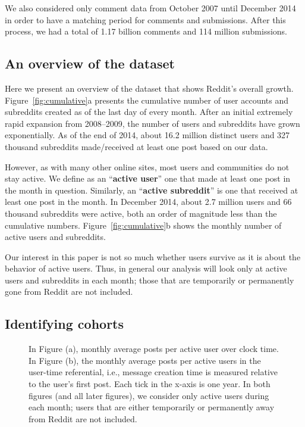We also considered only comment data from October 2007 until December 2014 in order to have a matching period for comments and submissions. After this process, we had a total of 1.17 billion comments and 114 million submissions.

\subsection{An overview of the dataset}

Here we present an overview of the dataset that shows Reddit's overall growth.  Figure~\ref{fig:cumulative}a presents the cumulative number of user accounts and subreddits created as of the last day of every month. After an initial extremely rapid expansion from 2008--2009, the number of users and subreddits have grown exponentially.  As of the end of 2014, about 16.2 million distinct users and 327 thousand subreddits made/received at least one post based on our data.

However, as with many other online sites, most users \cite{Scellato2011,Hughes2009,Java2007} and communities \cite{Arguello2006} do not stay active. We define as an ``\textbf{active user}'' one that made at least one post in the month in question. Similarly, an ``\textbf{active subreddit}'' is one that received at least one post in the month. In December 2014, about 2.7 million users and 66 thousand subreddits were active, both an order of magnitude less than the cumulative numbers. Figure~\ref{fig:cumulative}b shows the monthly number of active users and subreddits.

Our interest in this paper is not so much whether users survive as it is about the behavior of active users.  Thus, 
in general our analysis will look only at active users and subreddits in each month; those that are temporarily or permanently gone from Reddit are not included.  

\subsection{Identifying cohorts}

\begin{figure}[!tb]
\centering
{}
\caption{In Figure (a), monthly average posts per active user over clock time. In Figure (b), the monthly average posts per active users in the user-time referential, i.e., message creation time is measured relative to the user's first post.  Each tick in the x-axis is one year.  In both figures (and all later figures), we consider only active users during each month; users that are either temporarily or permanently away from Reddit are not included.}
\label{fig:overall_posts}
\end{figure}

